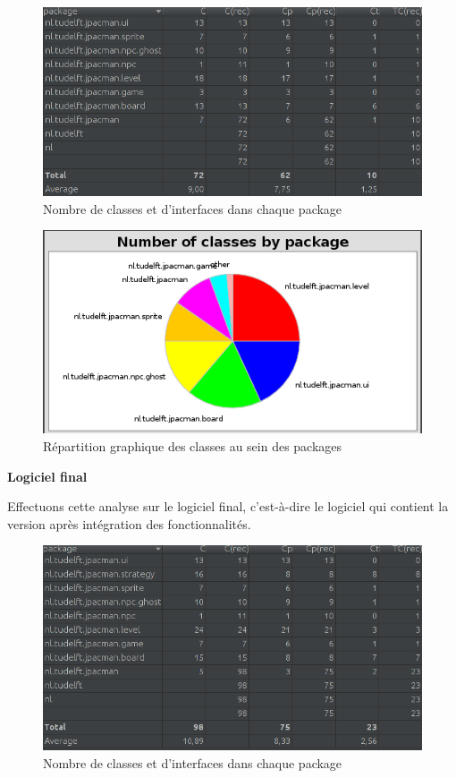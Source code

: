 \documentclass[12pt, openany]{report}
\begin{document}
\begin{figure}[!h]
	\centering
	\includegraphics[scale=0.6]{Images/classMetrics1.png} 
	\caption{Nombre de classes et d'interfaces dans chaque package}
	\label{classMetrics1}
\end{figure}

\begin{figure}[!h]
	\centering
	\includegraphics[scale=0.7]{Images/classMetrics2.png} 
	\caption{Répartition graphique des classes au sein des packages}
	\label{classMetrics2}
\end{figure}
\newpage
\textbf{Logiciel final}

Effectuons cette analyse sur le logiciel final, c'est-à-dire le logiciel qui contient la version après intégration des fonctionnalités.

\begin{figure}[!h]
	\centering
	\includegraphics[scale=0.6]{Images/classMetrics3.png} 
	\caption{Nombre de classes et d'interfaces dans chaque package}
	\label{classMetrics3}
\end{figure}
\end{document}
